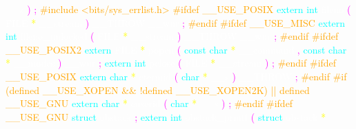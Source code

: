 \textcolor{white}{\_\_s} 
\textcolor{magenta}{)} 
\textcolor{magenta}{;} 
\textcolor{orange}{\#include <bits/sys\_errlist.h>} 
\textcolor{orange}{\#ifdef	\_\_USE\_POSIX} 
\textcolor{cyan}{extern} 
\textcolor{cyan}{int} 
\textcolor{white}{fileno} 
\textcolor{magenta}{(} 
\textcolor{white}{FILE} 
\textcolor{yellow}{*} 
\textcolor{white}{\_\_stream} 
\textcolor{magenta}{)} 
\textcolor{white}{\_\_THROW} 
\textcolor{white}{\_\_wur} 
\textcolor{magenta}{;} 
\textcolor{orange}{\#endif} 
\textcolor{orange}{\#ifdef \_\_USE\_MISC} 
\textcolor{cyan}{extern} 
\textcolor{cyan}{int} 
\textcolor{white}{fileno\_unlocked} 
\textcolor{magenta}{(} 
\textcolor{white}{FILE} 
\textcolor{yellow}{*} 
\textcolor{white}{\_\_stream} 
\textcolor{magenta}{)} 
\textcolor{white}{\_\_THROW} 
\textcolor{white}{\_\_wur} 
\textcolor{magenta}{;} 
\textcolor{orange}{\#endif} 
\textcolor{orange}{\#ifdef \_\_USE\_POSIX2} 
\textcolor{cyan}{extern} 
\textcolor{white}{FILE} 
\textcolor{yellow}{*} 
\textcolor{white}{popen} 
\textcolor{magenta}{(} 
\textcolor{cyan}{const} 
\textcolor{cyan}{char} 
\textcolor{yellow}{*} 
\textcolor{white}{\_\_command} 
\textcolor{magenta}{,} 
\textcolor{cyan}{const} 
\textcolor{cyan}{char} 
\textcolor{yellow}{*} 
\textcolor{white}{\_\_modes} 
\textcolor{magenta}{)} 
\textcolor{white}{\_\_wur} 
\textcolor{magenta}{;} 
\textcolor{cyan}{extern} 
\textcolor{cyan}{int} 
\textcolor{white}{pclose} 
\textcolor{magenta}{(} 
\textcolor{white}{FILE} 
\textcolor{yellow}{*} 
\textcolor{white}{\_\_stream} 
\textcolor{magenta}{)} 
\textcolor{magenta}{;} 
\textcolor{orange}{\#endif} 
\textcolor{orange}{\#ifdef	\_\_USE\_POSIX} 
\textcolor{cyan}{extern} 
\textcolor{cyan}{char} 
\textcolor{yellow}{*} 
\textcolor{white}{ctermid} 
\textcolor{magenta}{(} 
\textcolor{cyan}{char} 
\textcolor{yellow}{*} 
\textcolor{white}{\_\_s} 
\textcolor{magenta}{)} 
\textcolor{white}{\_\_THROW} 
\textcolor{magenta}{;} 
\textcolor{orange}{\#endif} 
\textcolor{orange}{\#if (defined \_\_USE\_XOPEN \&\& !defined \_\_USE\_XOPEN2K) || defined \_\_USE\_GNU} 
\textcolor{cyan}{extern} 
\textcolor{cyan}{char} 
\textcolor{yellow}{*} 
\textcolor{white}{cuserid} 
\textcolor{magenta}{(} 
\textcolor{cyan}{char} 
\textcolor{yellow}{*} 
\textcolor{white}{\_\_s} 
\textcolor{magenta}{)} 
\textcolor{magenta}{;} 
\textcolor{orange}{\#endif} 
\textcolor{orange}{\#ifdef	\_\_USE\_GNU} 
\textcolor{cyan}{struct} 
\textcolor{white}{obstack} 
\textcolor{magenta}{;} 
\textcolor{cyan}{extern} 
\textcolor{cyan}{int} 
\textcolor{white}{obstack\_printf} 
\textcolor{magenta}{(} 
\textcolor{cyan}{struct} 
\textcolor{white}{obstack} 
\textcolor{yellow}{*} 
